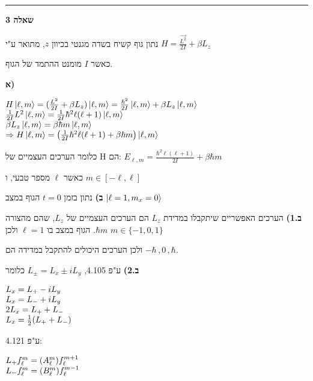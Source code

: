 \documentclass[14pt]{extarticle}
\makeatletter
\newenvironment{lefteqs}{%
    \begin{english}%
    \begin{flushleft}%
    \renewcommand{\arraystretch}{1.3}%
    $\begin{array}{@{}l@{}}%
}{%
    \end{array}$%
    \end{flushleft}%
    \end{english}%
}
\makeatother
\begin{document}
\vspace{3em}
\hrule
\vspace{2em}

\textbf{\large שאלה 3}

נתון גוף קשיח בשדה מגנטי בכיוון $z$, מתואר ע"י $H=\frac{\vec{L^2}}{2I} + \beta L_z$

כאשר $I$ מומנט ההתמד של הגוף.


\textbf{א)}

\begin{lefteqs}
    H \ket{\ell,m} = (\frac{L^2}{2I} + \beta L_z) \ket{\ell,m} = \frac{\hbar^2}{2I} \ket{\ell, m} + \beta L_z \ket{\ell,m} \\
    \frac{1}{2I} L^2 \ket{\ell, m} = \frac{1}{2I} \hbar^2 \ell (\ell + 1) \ket{\ell, m} \\
    \beta L_z \ket{\ell, m} = \beta \hbar m \ket{\ell, m} \\ 
    \Rightarrow H \ket{\ell, m} = \left( \frac{1}{2I} \hbar^2 \ell (\ell + 1) + \beta \hbar m \right) \ket{\ell, m}
\end{lefteqs}

כלומר הערכים העצמיים של H הם: $E_{\ell, m} = \frac{\hbar^2 \ell (\ell + 1)}{2I} + \beta \hbar m$

כאשר $\ell$ מספר טבעי, ו $m \in [-\ell, \ell]$

\textbf{ב)}
נתון בזמן $t=0$ הגוף במצב $\ket{\ell=1, m_x=0}$

\textbf{ב.1)}
הערכים האפשריים שיתקבלו במדידת $L_z$ הם הערכים העצמיים של $L_z$, שהם מהצורה $\hbar m$.
הגוף במצב בו $\ell =1$ ולכן $m \in \{-1, 0, 1\}$

ולכן הערכים היכולים להתקבל במדידה הם $-\hbar\, , 0\, , \hbar$.


\textbf{ב.2)}
ע"פ 4.105, $L_{\pm} = L_x \pm i L_y$ כלומר

\begin{lefteqs}
    L_x = L_+ - i L_y \\
    L_x = L_- + i L_y \\
    2L_x = L_+ + L_- \\
    L_x = \frac{1}{2} (L_+ + L_-) \\
\end{lefteqs}

ע"פ 4.121:
\begin{lefteqs}
    L_+ f_{\ell}^m = (A_{\ell}^m) f_{\ell}^{m+1} \\
    L_- f_{\ell}^m = (B_{\ell}^m) f_{\ell}^{m-1} \\
\end{lefteqs}
\end{document}
